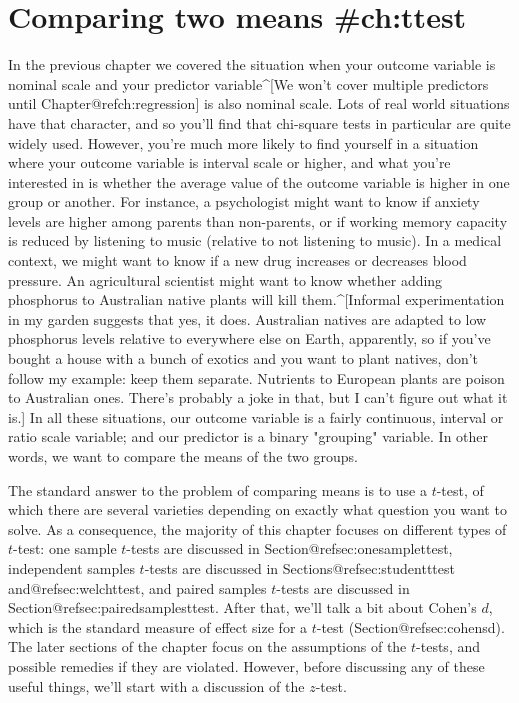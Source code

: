 

\chapter{Comparing two means {#ch:ttest}}


In the previous chapter we covered the situation when your outcome variable is nominal scale and your predictor variable^[We won't cover multiple predictors until Chapter@refch:regression] is also nominal scale. Lots of real world situations have that character, and so you'll find that chi-square tests in particular are quite widely used. However, you're much more likely to find yourself in a situation where your outcome variable is interval scale or higher, and what you're interested in is whether the average value of the outcome variable is higher in one group or another. For instance, a psychologist might want to know if anxiety levels are higher among parents than non-parents, or if working memory capacity is reduced by listening to music (relative to not listening to music). In a medical context, we might want to know if a new drug increases or decreases blood pressure. An agricultural scientist might want to know whether adding phosphorus to Australian native plants will kill them.^[Informal experimentation in my garden suggests that yes, it does. Australian natives are adapted to low phosphorus levels relative to everywhere else on Earth, apparently, so if you've bought a house with a bunch of exotics and you want to plant natives, don't follow my example: keep them separate. Nutrients to European plants are poison to Australian ones. There's probably a joke in that, but I can't figure out what it is.] In all these situations, our outcome variable is a fairly continuous, interval or ratio scale variable; and our predictor is a binary "grouping" variable. In other words, we want to compare the means of the two groups. 

The standard answer to the problem of comparing means is to use a $t$-test, of which there are several varieties depending on exactly what question you want to solve. As a consequence, the majority of this chapter focuses on different types of $t$-test: one sample $t$-tests are discussed in Section@refsec:onesamplettest, independent samples $t$-tests are discussed in Sections@refsec:studentttest and@refsec:welchttest, and paired samples $t$-tests are discussed in Section@refsec:pairedsamplesttest. After that, we'll talk a bit about Cohen's $d$, which is the standard measure of effect size for a $t$-test (Section@refsec:cohensd). The later sections of the chapter focus on the assumptions of the $t$-tests, and possible remedies if they are violated. However, before discussing any of these useful things, we'll start with a discussion of the $z$-test. 


